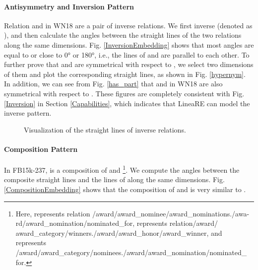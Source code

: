 \documentclass[conference]{IEEEtran}
\begin{document}
\paragraph{Antisymmetry and Inversion Pattern}
Relation  and  in WN18 are a pair of inverse relations. We first inverse  (denoted as ), and then calculate the angles between the straight lines of the two relations along the same dimensions. Fig. \ref{InversionEmbedding} shows that most angles are equal to or close to 0° or 180°, i.e., the lines of  and  are parallel to each other. To further prove that  and  are symmetrical with respect to , we select two dimensions of them and plot the corresponding straight lines, as shown in Fig. \ref{hypernym}. In addition, we can see from Fig. \ref{has_part} that  and  in WN18 are also symmetrical with respect to . These figures are completely consistent with Fig. \ref{Inversion} in Section \ref{Capabilities}, which indicates that LineaRE can model the inverse pattern.
\begin{figure}[t]
	\centering
	\caption{
		Visualization of the straight lines of inverse relations.
	}
	\label{InversionLine}
\end{figure}

\paragraph{Composition Pattern}
In FB15k-237,  is a composition of  and \footnote{
	Here,  represents relation /award/award\_nominee/award\_nominations./awa-
	rd/award\_nomination/nominated\_for,  represents relation/award/ award\_category/winners./award/award\_honor/award\_winner, and  represents /award/award\_category/nominees./award/award\_nomination/nominated\_ for.
}. We compute the angles between the composite straight lines and the lines of  along the same dimensions. Fig. \ref{CompositionEmbedding} shows that the composition of  and  is very similar to .
\end{document}
